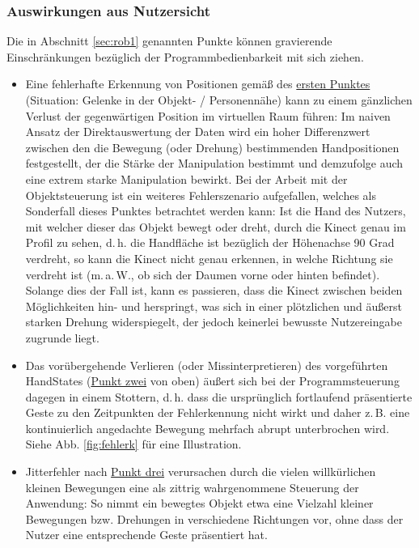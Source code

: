 \begin{enumerate}[label=(\roman*)]
	\end{enumerate}
\subsubsection{Auswirkungen aus Nutzersicht}
	Die in Abschnitt \ref{sec:rob1} genannten Punkte können gravierende Einschränkungen bezüglich der Programmbedienbarkeit mit sich ziehen.
	\begin{itemize}
	\item Eine fehlerhafte Erkennung von Positionen gemäß des \hyperref[itm:problem1]{ersten Punktes} (Situation: Gelenke in der Objekt- / Personennähe) kann zu einem gänzlichen Verlust der gegenwärtigen Position im virtuellen Raum führen: Im naiven Ansatz der Direktauswertung der Daten wird ein hoher Differenzwert zwischen den die Bewegung (oder Drehung) bestimmenden Handpositionen festgestellt, der die Stärke der Manipulation bestimmt und demzufolge auch eine extrem starke Manipulation bewirkt. Bei der Arbeit mit der Objektsteuerung ist ein weiteres Fehlerszenario aufgefallen, welches als Sonderfall dieses Punktes betrachtet werden kann: Ist die Hand des Nutzers, mit welcher dieser das Objekt bewegt oder dreht, durch die Kinect genau im Profil zu sehen, d.\,h. die Handfläche ist bezüglich der Höhenachse 90 Grad verdreht, so kann die Kinect nicht genau erkennen, in welche Richtung sie verdreht ist (m.\,a.\,W., ob sich der Daumen vorne oder hinten befindet). Solange dies der Fall ist, kann es passieren, dass die Kinect zwischen beiden Möglichkeiten hin- und herspringt, was sich in einer plötzlichen und äußerst starken Drehung widerspiegelt, der jedoch keinerlei bewusste Nutzereingabe zugrunde liegt.
	\item Das vorübergehende Verlieren (oder Missinterpretieren) des vorgeführten HandStates (\hyperref[itm:problem2]{Punkt zwei} von oben) äußert sich bei der Programmsteuerung dagegen in einem Stottern, d.\,h. dass die ursprünglich fortlaufend präsentierte Geste zu den Zeitpunkten der Fehlerkennung nicht wirkt und daher z.\,B. eine kontinuierlich angedachte Bewegung mehrfach abrupt unterbrochen wird. Siehe Abb. \ref{fig:fehlerk} für eine Illustration.
	\item Jitterfehler nach \hyperref[itm:problem3]{Punkt drei} verursachen durch die vielen willkürlichen kleinen Bewegungen eine als \glqq zittrig\grqq{} wahrgenommene Steuerung der Anwendung: So nimmt ein bewegtes Objekt etwa eine Vielzahl kleiner Bewegungen bzw. Drehungen in verschiedene Richtungen vor, ohne dass der Nutzer eine entsprechende Geste präsentiert hat.\par 

\end{itemize}
